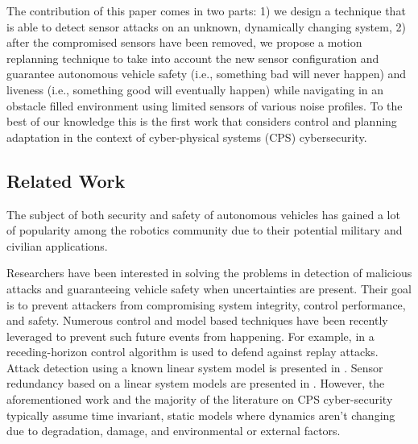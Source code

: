 The contribution of this paper comes in two parts: 1) we design a technique that is able to detect sensor attacks on an unknown, dynamically changing system, 2) after the compromised sensors have been removed, we propose a motion replanning technique to take into account the new sensor configuration and  guarantee autonomous vehicle safety (i.e., something bad will never happen) and liveness (i.e., something good will eventually happen) while navigating in an obstacle filled environment using limited sensors of various noise profiles. 
To the best of our knowledge this is the first work that considers control and planning adaptation in the context of cyber-physical systems (CPS) cybersecurity.





\subsection{Related Work}
\label{sec:Related Work}

The subject of both security and safety of autonomous vehicles has gained a lot of popularity among the robotics community due to their potential military and civilian applications.

Researchers have been interested in solving the problems in detection of malicious attacks and guaranteeing vehicle safety when uncertainties are present. Their goal is to prevent attackers from compromising system integrity, control performance, and safety. Numerous control and model based techniques have been recently leveraged to prevent such future events from happening. For example, in \cite{zhu2012resilient} a receding-horizon control algorithm is used to defend against replay attacks. Attack detection using a known linear system model is presented in \cite{pasqualetti2013attack}. Sensor redundancy based on a linear system models are presented in \cite{fawzi2014secure,6943080,7330811} . However, the aforementioned work and the majority of the literature on CPS cyber-security typically assume time invariant, static models where dynamics aren't changing due to degradation, damage, and environmental or external factors.

